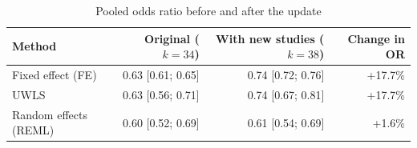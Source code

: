 \begin{table}[htbp]
\centering
\small
\caption{Pooled odds ratio before and after the update}
\label{tab:update-pooled}
\begin{tabular}{lrrr}
\toprule
Method & Original ($k=34$) & With new studies ($k=38$) & Change in OR \\
\midrule
Fixed effect (FE) & 0.63 [0.61; 0.65] & 0.74 [0.72; 0.76] & +17.7\% \\
UWLS & 0.63 [0.56; 0.71] & 0.74 [0.67; 0.81] & +17.7\% \\
Random effects (REML) & 0.60 [0.52; 0.69] & 0.61 [0.54; 0.69] & +1.6\% \\
\bottomrule
\end{tabular}
\end{table}
